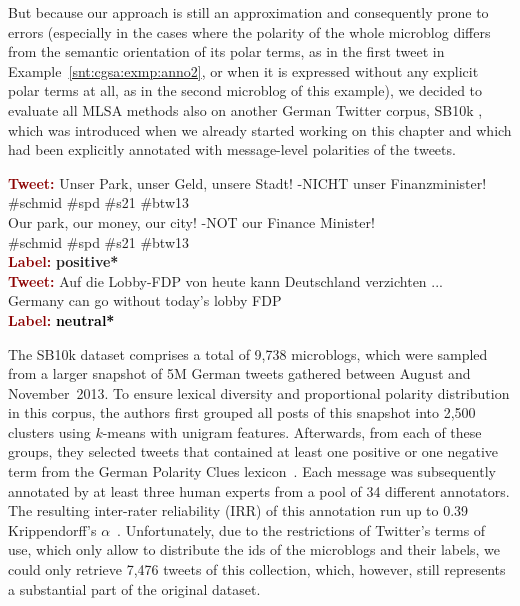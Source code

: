 But because our approach is still an approximation and consequently
prone to errors (especially in the cases where the polarity of the
whole microblog differs from the semantic orientation of its polar
terms, as in the first tweet in Example~\ref{snt:cgsa:exmp:anno2}, or
when it is expressed without any explicit polar terms at all, as in
the second microblog of this example), we decided to evaluate all MLSA
methods also on another German Twitter corpus, SB10k
\cite{Cieliebak:17}, which was introduced when we already started
working on this chapter and which had been explicitly annotated with
message-level polarities of the tweets.

\begin{example}\label{snt:cgsa:exmp:anno2}
  \noindent\textup{\bfseries\textcolor{darkred}{Tweet:}} {\upshape
    Unser Park, unser Geld, unsere Stadt! -NICHT unser Finanzminister!
    \emoexpression[polarity=positive]{\smiley{}} \#schmid \#spd \#s21
    \#btw13}\\
  \noindent Our park, our money, our city! -NOT our Finance Minister!\\
  \emoexpression[polarity=positive]{\smiley{}} \#schmid \#spd \#s21
  \#btw13\\
  \noindent\textup{\bfseries\textcolor{darkred}{Label:}}\hspace*{2em}\textbf{%
    \upshape\textcolor{green3}{positive*}}\\[1.5em]
  \noindent\textup{\bfseries\textcolor{darkred}{Tweet:}} {\upshape Auf die Lobby-FDP von heute kann Deutschland verzichten ...}\\
  \noindent Germany can go without today's lobby FDP\\
  \noindent\textup{\bfseries\textcolor{darkred}{Label:}}\hspace*{2em}\textbf{%
    \upshape\textcolor{black}{neutral*}}
\end{example}

The SB10k dataset comprises a total of 9,738 microblogs, which were
sampled from a larger snapshot of 5M German tweets gathered between
August and November~2013.  To ensure lexical diversity and
proportional polarity distribution in this corpus, the authors first
grouped all posts of this snapshot into 2,500 clusters using $k$-means
with unigram features.  Afterwards, from each of these groups, they
selected tweets that contained at least one positive or one negative
term from the German Polarity Clues lexicon~\cite{Waltinger:10}.  Each
message was subsequently annotated by at least three human experts
from a pool of 34 different annotators.  The resulting inter-rater
reliability (IRR) of this annotation run up to 0.39 Krippendorff's
$\alpha$~\cite{Krippendorff:07}.  Unfortunately, due to the
restrictions of Twitter's terms of use, which only allow to distribute
the ids of the microblogs and their labels, we could only retrieve
7,476 tweets of this collection, which, however, still represents a
substantial part of the original dataset.

